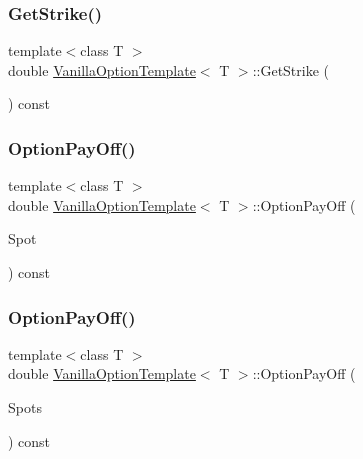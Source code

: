\subsubsection{\texorpdfstring{Get\+Strike()}{GetStrike()}}
{\footnotesize\ttfamily template$<$class T $>$ \\
double \hyperlink{classVanillaOptionTemplate}{Vanilla\+Option\+Template}$<$ T $>$\+::Get\+Strike (\begin{DoxyParamCaption}{ }\end{DoxyParamCaption}) const}

\hypertarget{classVanillaOptionTemplate_ac355bde544ec2ea3779e12e5595d4788}{}\label{classVanillaOptionTemplate_ac355bde544ec2ea3779e12e5595d4788} 
\subsubsection{\texorpdfstring{Option\+Pay\+Off()}{OptionPayOff()}\hspace{0.1cm}{\footnotesize\ttfamily [1/2]}}
{\footnotesize\ttfamily template$<$class T $>$ \\
double \hyperlink{classVanillaOptionTemplate}{Vanilla\+Option\+Template}$<$ T $>$\+::Option\+Pay\+Off (\begin{DoxyParamCaption}\item[{double}]{Spot }\end{DoxyParamCaption}) const}

\hypertarget{classVanillaOptionTemplate_ab9298da63689b7560b45ca564ac74796}{}\label{classVanillaOptionTemplate_ab9298da63689b7560b45ca564ac74796} 
\subsubsection{\texorpdfstring{Option\+Pay\+Off()}{OptionPayOff()}\hspace{0.1cm}{\footnotesize\ttfamily [2/2]}}
{\footnotesize\ttfamily template$<$class T $>$ \\
double \hyperlink{classVanillaOptionTemplate}{Vanilla\+Option\+Template}$<$ T $>$\+::Option\+Pay\+Off (\begin{DoxyParamCaption}\item[{const \hyperlink{classMJArray}{M\+J\+Array} \&}]{Spots }\end{DoxyParamCaption}) const}

